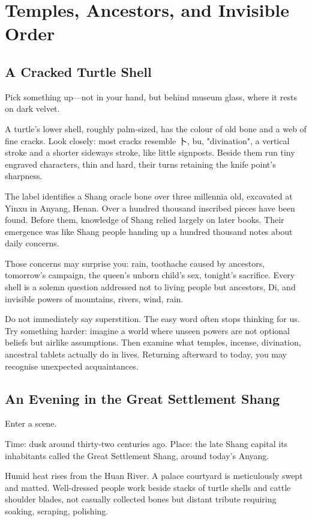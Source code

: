 \chapter[Temples, Ancestors, Invisible Order]{Temples, Ancestors, and Invisible Order}
\section{A Cracked Turtle Shell}
Pick something up---not in your hand, but behind museum glass, where it rests on dark velvet.

A turtle's lower shell, roughly palm-sized, has the colour of old bone and a web of fine cracks. Look closely: most cracks resemble \mbox{卜}, bu, "divination", a vertical stroke and a shorter sideways stroke, like little signposts. Beside them run tiny engraved characters, thin and hard, their turns retaining the knife point's sharpness.

The label identifies a Shang oracle bone over three millennia old, excavated at Yinxu in Anyang, Henan. Over a hundred thousand inscribed pieces have been found. Before them, knowledge of Shang relied largely on later books. Their emergence was like Shang people handing up a hundred thousand notes about daily concerns.

Those concerns may surprise you: rain, toothache caused by ancestors, tomorrow's campaign, the queen's unborn child's sex, tonight's sacrifice. Every shell is a solemn question addressed not to living people but ancestors, Di, and invisible powers of mountains, rivers, wind, rain.

Do not immediately say superstition. The easy word often stops thinking for us. Try something harder: imagine a world where unseen powers are not optional beliefs but airlike assumptions. Then examine what temples, incense, divination, ancestral tablets actually do in lives. Returning afterward to today, you may recognise unexpected acquaintances.

\section{An Evening in the Great Settlement Shang}
Enter a scene.

Time: dusk around thirty-two centuries ago. Place: the late Shang capital its inhabitants called the Great Settlement Shang, around today's Anyang.

Humid heat rises from the Huan River. A palace courtyard is meticulously swept and matted. Well-dressed people work beside stacks of turtle shells and cattle shoulder blades, not casually collected bones but distant tribute requiring soaking, scraping, polishing.

